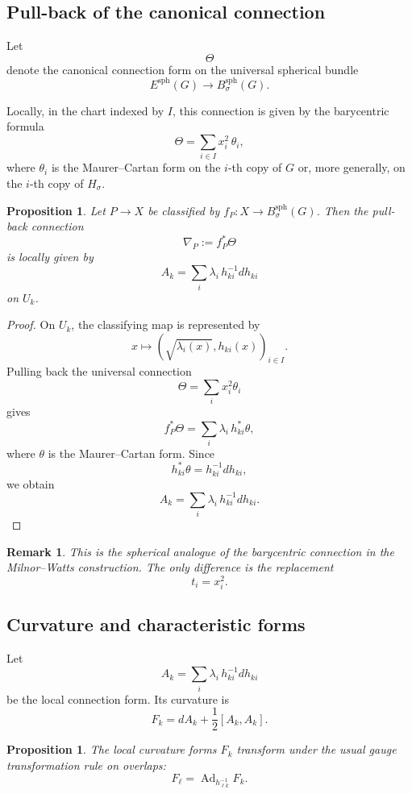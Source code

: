 \documentclass[11pt]{amsart}
\newtheorem{proposition}[definition]{Proposition}
\newtheorem{remark}[definition]{Remark}
\begin{document}
\subsection{Pull-back of the canonical connection}

Let
\[
\Theta
\]
denote the canonical connection form on the universal spherical bundle
\[
E^{\mathrm{sph}}(G)\to B^{\mathrm{sph}}_\sigma(G).
\]

Locally, in the chart indexed by \(I\), this connection is given by the barycentric formula
\[
\Theta
=
\sum_{i\in I} x_i^2\,\theta_i,
\]
where \(\theta_i\) is the Maurer--Cartan form on the \(i\)-th copy of \(G\) or, more generally, on the \(i\)-th copy of \(H_\sigma\).

\begin{proposition}
Let \(P\to X\) be classified by \(f_P:X\to B^{\mathrm{sph}}_\sigma(G)\). Then the pull-back connection
\[
\nabla_P:=f_P^*\Theta
\]
is locally given by
\[
A_k
=
\sum_i \lambda_i\, h_{ki}^{-1}dh_{ki}
\]
on \(U_k\).
\end{proposition}

\begin{proof}
On \(U_k\), the classifying map is represented by
\[
x\longmapsto
\left(\sqrt{\lambda_i(x)},h_{ki}(x)\right)_{i\in I}.
\]
Pulling back the universal connection
\[
\Theta=\sum_i x_i^2\theta_i
\]
gives
\[
f_P^*\Theta
=
\sum_i \lambda_i\, h_{ki}^*\theta,
\]
where \(\theta\) is the Maurer--Cartan form. Since
\[
h_{ki}^*\theta=h_{ki}^{-1}dh_{ki},
\]
we obtain
\[
A_k=\sum_i \lambda_i\,h_{ki}^{-1}dh_{ki}.
\]
\end{proof}

\begin{remark}
This is the spherical analogue of the barycentric connection in the Milnor--Watts construction. The only difference is the replacement
\[
t_i=x_i^2.
\]
\end{remark}

\subsection{Curvature and characteristic forms}

Let
\[
A_k
=
\sum_i \lambda_i\,h_{ki}^{-1}dh_{ki}
\]
be the local connection form. Its curvature is
\[
F_k
=
dA_k+\frac12[A_k,A_k].
\]

\begin{proposition}
The local curvature forms \(F_k\) transform under the usual gauge transformation rule on overlaps:
\[
F_\ell
=
\operatorname{Ad}_{h_{\ell k}^{-1}}F_k.
\]
\end{proposition}
\end{document}
